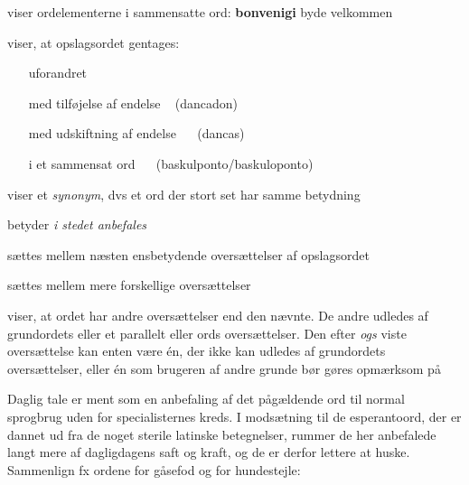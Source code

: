 
\begin{description}[style=multiline,nosep,itemsep=3ex,itemindent=0.5cm]
	\item[\textbar]
	viser ordelementerne i sammensatte ord: \textbf{bon{\textbar}ven{\textbar}ig{\textbar}i} byde velkommen

	\item[\T]
	 viser, at opslagsordet gentages:

	\begin{itemize}[leftmargin=4em, align=left]
		\item[uforandret]  

		\item[med tilf{\o}jelse af endelse] \  (dancadon)
		
		\item[med udskiftning af endelse] \ \  (dancas)
		
		\item[i et sammensat ord] \ \  (baskulponto/baskuloponto)

	\end{itemize}

	\item[=] viser et \textit{synonym}, dvs et ord der stort set har samme betydning
	
	\item[$\rightarrow $] betyder \textit{i stedet anbefales}
	
	\item[,] s{\ae}ttes mellem n{\ae}sten ensbetydende overs{\ae}ttelser af
	opslagsordet
	

	\item[;] s{\ae}ttes mellem mere forskellige overs{\ae}ttelser
	
	\item[ogs] 
	viser, at ordet har andre overs{\ae}ttelser end den n{\ae}vnte.
	De andre udledes af grund\-ord\-ets eller et parallelt
	 eller
	ords overs{\ae}ttelser. Den efter \textit{ogs}
	viste overs{\ae}ttelse kan enten v{\ae}re \'en, der ikke kan udledes af
	grundordets overs{\ae}ttelser, eller \'en som brugeren af andre grunde
	b{\o}r g{\o}res opm{\ae}rksom p{\aa}
	
	\item[dgl] Daglig tale er ment som en anbefaling
	af det p{\aa}g{\ae}ldende ord til normal sprogbrug uden for
	specialisternes kreds. I mods{\ae}tning til de esperantoord, der er
	dannet ud fra de noget sterile latinske betegnelser, rummer de her
	anbefalede langt mere af dagligdagens saft og kraft, og de er derfor
	lettere at huske. Sammenlign fx ordene for g{\aa}sefod og for
	hundestejle:



\end{description}

